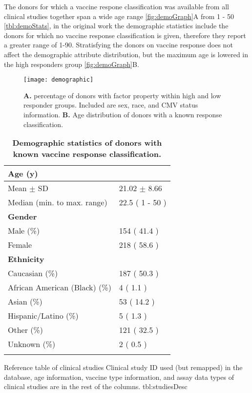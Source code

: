 The donors for which a vaccine respone classification was available from all
clinical studies together span a wide age range \autoref{fig:demoGraph}A from 1
- 50 \autoref{tbl:demoStats}, in the original work the demographic statistics
include the donors for which no vaccine response classification is given,
therefore they report a greater range of 1-90. Stratisfying the donors on
vaccine response does not affect the demographic attribute distribution, but
the maximum age is lowered in the high responders group
\autoref{fig:demoGraph}B.

\begin{figure}
    \texttt{[image: demographic]}
    \caption{\textbf{A.} percentage of donors with factor property within high
    and low responder groups. Included are sex, race, and CMV status
    information. \textbf{B.} Age distribution of donors with a known response
    classification.}\label{fig:demoGraph}
\end{figure}



\begin{table}
\centering
\begin{tabular}{ll}
\toprule
\textbf{Age (y)} & \\
\midrule
Mean $\pm$ SD & 21.02 $\pm$ 8.66\\
Median (min. to max. range) & 22.5  ( 1 - 50 )\\
\addlinespace
    \textbf{Gender} & \\
\midrule
Male (\%) & 154 ( 41.4 )\\
Female & 218  ( 58.6 )\\
\addlinespace
    \textbf{Ethnicity} & \\
\midrule
Caucasian (\%) & 187 ( 50.3 )\\
African American (Black) (\%) & 4  ( 1.1 )\\
Asian (\%) & 53  ( 14.2 )\\
Hispanic/Latino (\%) & 5  ( 1.3 )\\
Other (\%) & 121  ( 32.5 )\\
Unknown (\%) & 2  ( 0.5 )\\
\bottomrule{}
\end{tabular}
\caption{\textbf{Demographic statistics of donors with known vaccine response classification.}}\label{tbl:demoStats}
\end{table}

{Reference table of clinical studies}
{Clinical study ID used (but remapped) in the database, age information,
vaccine type information, and assay data types of clinical studies are in the
rest of the columns.}
{tbl:studiesDesc}


